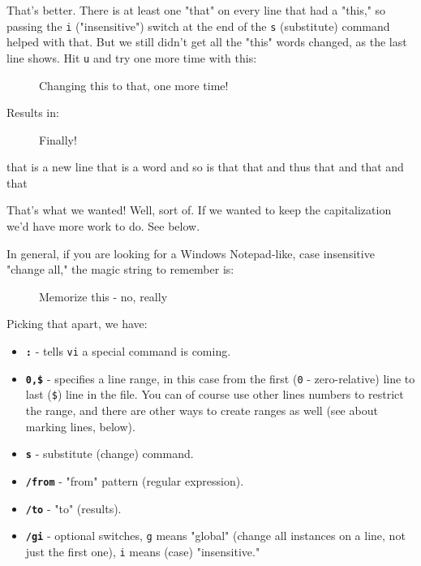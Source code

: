 \documentclass[10pt,american,]{book}
\newenvironment{Shaded}{\begin{snugshade}}{\end{snugshade}}
\newcommand{\KeywordTok}[1]{\textcolor[rgb]{0.13,0.29,0.53}{\textbf{{#1}}}}
\newcommand{\OtherTok}[1]{\textcolor[rgb]{0.56,0.35,0.01}{{#1}}}
\newcommand{\NormalTok}[1]{{#1}}
\numberwithin{figure}{chapter}
\DeclareRobustCommand{\drcap}[1]{\begin{figure}[H]\caption{#1}\end{figure}}
\renewcommand{\KeywordTok}[1]{{#1}}
\renewcommand{\OtherTok}[1]{{#1}}
\renewcommand{\NormalTok}[1]{{#1}}
\begin{document}
That's better. There is at least one "that" on every line that had a
"this," so passing the \texttt{i} ("insensitive") switch at the end of
the \texttt{s} (substitute) command helped with that. But we still
didn't get all the "this" words changed, as the last line shows. Hit
\texttt{u} and try one more time with this:

\drcap{Changing this to that, one more time!}

\begin{Shaded}
\end{Shaded}

Results in:

\drcap{Finally!}

\begin{Shaded}
\begin{Highlighting}[]
\KeywordTok{that} \NormalTok{is a new line}
\KeywordTok{that} \NormalTok{is a word}
\KeywordTok{and} \NormalTok{so is that}
\KeywordTok{that} \NormalTok{and thus}
\KeywordTok{that} \NormalTok{and that and that}
\end{Highlighting}
\end{Shaded}

That's what we wanted! Well, sort of. If we wanted to keep the
capitalization we'd have more work to do. See below.

In general, if you are looking for a Windows Notepad-like, case
insensitive "change all," the magic string to remember is:

\drcap{Memorize this - no, really}

\begin{Shaded}
\end{Shaded}

Picking that apart, we have:

\begin{itemize}
\item
  \textbf{\texttt{:}} - tells \texttt{vi} a special command is coming.
\item
  \textbf{\texttt{0,\$}} - specifies a line range, in this case from the
  first (\texttt{0} - zero-relative) line to last (\texttt{\$}) line in
  the file. You can of course use other lines numbers to restrict the
  range, and there are other ways to create ranges as well (see about
  marking lines, below).
\item
  \textbf{\texttt{s}} - substitute (change) command.
\item
  \textbf{\texttt{/from}} - "from" pattern (regular expression).
\item
  \textbf{\texttt{/to}} - "to" (results).
\item
  \textbf{\texttt{/gi}} - optional switches, \texttt{g} means "global"
  (change all instances on a line, not just the first one), \texttt{i}
  means (case) "insensitive."
\end{itemize}
\end{document}
